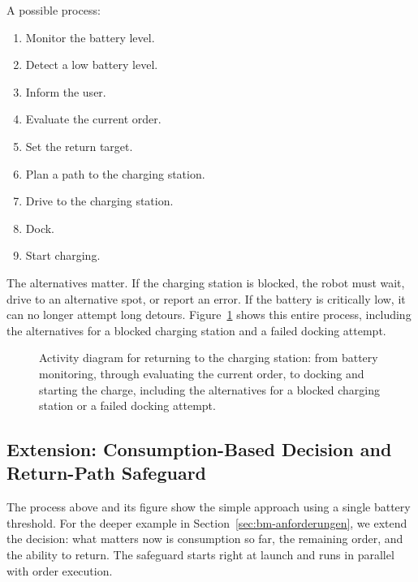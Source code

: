 A possible process:

\begin{enumerate}
    \item Monitor the battery level.
    \item Detect a low battery level.
    \item Inform the user.
    \item Evaluate the current order.
    \item Set the return target.
    \item Plan a path to the charging station.
    \item Drive to the charging station.
    \item Dock.
    \item Start charging.
\end{enumerate}

The alternatives matter. If the charging station is blocked, the robot must wait, drive to an alternative spot, or report an error. If the battery is critically low, it can no longer attempt long detours. Figure~\ref{fig:kap11-aktivitaet-rueckkehr-ladestation} shows this entire process, including the alternatives for a blocked charging station and a failed docking attempt.

\begin{figure}[H]
  \centering
  \caption{Activity diagram for returning to the charging station: from battery monitoring, through evaluating the current order, to docking and starting the charge, including the alternatives for a blocked charging station or a failed docking attempt.}
  \label{fig:kap11-aktivitaet-rueckkehr-ladestation}
\end{figure}

\subsection{Extension: Consumption-Based Decision and Return-Path Safeguard}
\label{sec:bm-ablauf}
The process above and its figure show the simple approach using a single battery threshold. For the deeper example in Section~\ref{sec:bm-anforderungen}, we extend the decision: what matters now is consumption so far, the remaining order, and the ability to return. The safeguard starts right at launch and runs in parallel with order execution.

